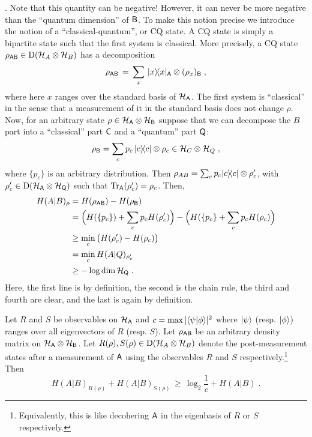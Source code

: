 . Note that this quantity can be negative! However, it can never be more negative than the ``quantum dimension'' of ${\textsf{B}}$. To make this notion precise we introduce the notion of a ``classical-quantum'', or CQ state. A CQ state is simply a bipartite state such that the first system is classical. More precisely, a CQ state $\rho_{{\textsf{AB}}} \in \mathrm{D}(\mathcal{H}_A \otimes \mathcal{H}_B)$ has a decomposition
\[ \rho_{{\textsf{AB}}}\,=\, \sum_{x} \,|x\rangle\!\langle x|_{\textsf{A}} \otimes (\rho_x)_{{\textsf{B}}}\;,\]
where here $x$ ranges over the standard basis of $\mathcal{H}_{\textsf{A}}$. The first system is ``classical'' in the sense that a measurement of it in the standard basis does not change $\rho$. Now, for an arbitrary state $\rho \in \mathcal{H}_{\textsf{A}} \otimes \mathcal{H}_{{\textsf{B}}}$ suppose that we can decompose the $B$ part into a ``classical'' part ${\textsf{C}}$ and a ``quantum'' part ${\textsf{Q}}$: 
\[ \rho_{{\textsf{B}}} = \sum_c p_c\,|c\rangle\!\langle c|\otimes \rho_c \in \mathcal{H}_C \otimes \mathcal{H}_Q\;,\]
where $\{p_c\}$ is an arbitrary distribution. Then $\rho_{AB} = \sum_c p_c |c\rangle\!\langle c| \otimes \rho'_c$, with $\rho'_c \in \mathrm{D}(\mathcal{H}_{\textsf{A}} \otimes \mathcal{H}_{{\textsf{Q}}})$ such that $\mbox{\rm Tr}_{{\textsf{A}}}(\rho'_c) = \rho_c$. Then,
\begin{align}
H(A|B)_\rho &= H(\rho_{\textsf{AB}}) - H(\rho_{\textsf{B}})\notag\\
&= \Big(H(\{p_c\}) + \sum_c p_c H(\rho'_c) \Big) - \Big( H(\{p_c\} + \sum_c p_c H(\rho_c)\Big)\notag\\
&\geq \min_c \big( H(\rho'_c) - H(\rho_c) \big)\notag\\
&= \min_c H(A|Q)_{\rho'_c}\notag\\
&\geq -\log\dim \mathcal{H}_{\textsf{Q}}\;.\label{eq:dimq-lb}
\end{align}
Here, the first line is by definition, the second is the chain rule, the third and fourth are clear, and the last is again by definition.



\begin{theorem}\label{thm:uncertainty-quantum}
Let  $R$ and $S$ be observables on $\mathcal{H}_{{\textsf{A}}}$ and $c = \max | \langle\psi| \phi\rangle|^2$ where $|\psi\rangle$ (resp. $|\phi\rangle$) ranges over all eigenvectors of $R$ (resp. $S$). Let $\rho_{{\textsf{AB}}}$ be an arbitrary density matrix on $\mathcal{H}_{\textsf{A}}\otimes \mathcal{H}_{{\textsf{B}}}$. Let $R(\rho), S(\rho)\in \mathrm{D}(\mathcal{H}_A\otimes \mathcal{H}_B)$ denote the post-measurement states after a measurement of ${\textsf{A}}$ using the observables $R$ and $S$ respectively.\footnote{Equivalently, this is like decohering ${\textsf{A}}$ in the eigenbasis of $R$ or $S$ respectively.} Then 
\begin{equation}\label{eq:unc-quantum}
 H(A|B)_{R(\rho)} + H(A|B)_{S(\rho)} \,\geq\, \log_2\frac{1}{c} + H(A|B)\;.
\end{equation}
\end{theorem}

